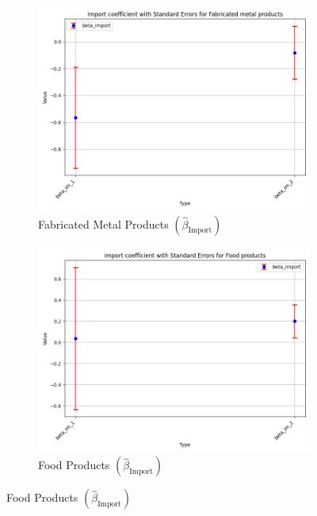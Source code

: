 \documentclass{article}
\begin{document}
\begin{figure}[ht!]
    \begin{subfigure}[t]{0.32\textwidth}
        \centering
        \includegraphics[width=\textwidth]{figure/empirical_stat_mixture_kmshare_ciiu_beta_import_with_error_bars_Fabricated metal products.png}
        \caption{Fabricated Metal Products $(\hat{\beta}_{\text{Import}})$}
    \end{subfigure}
    \begin{subfigure}[t]{0.32\textwidth}
        \centering
        \includegraphics[width=\textwidth]{figure/empirical_stat_mixture_kmshare_ciiu_beta_import_with_error_bars_Food products.png}
        \caption{Food Products $(\hat{\beta}_{\text{Import}})$}
    \end{subfigure}

\end{figure}
\end{document}
